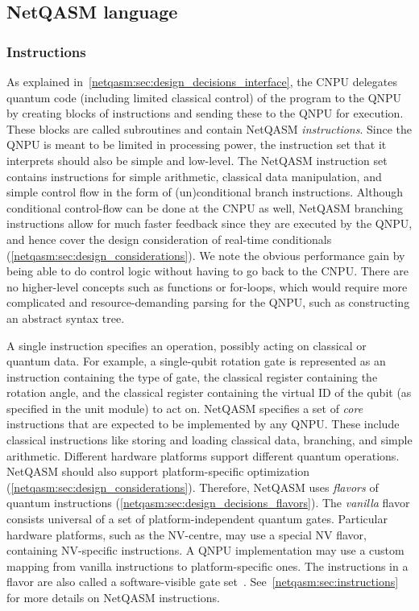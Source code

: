 \subsection{NetQASM language}

\subsubsection{Instructions}
\label{netqasm:sec:design_decisions_language}
As explained in~\cref{netqasm:sec:design_decisions_interface}, the \ac{CNPU} delegates quantum code (including limited classical control) of the program to the \ac{QNPU} by creating blocks of instructions and sending these to the \ac{QNPU} for execution.
These blocks are called subroutines and contain \ac{NetQASM} \textit{instructions}.
Since the \ac{QNPU} is meant to be limited in processing power, the instruction set that it interprets should also be simple and low-level.
The \ac{NetQASM} instruction set contains instructions for simple arithmetic, classical data manipulation, and simple control flow in the form of (un)conditional branch instructions.
Although conditional control-flow can be done at the \ac{CNPU} as well, \ac{NetQASM} branching instructions allow for much faster feedback since they are executed by the \ac{QNPU}, and hence cover the design consideration of real-time conditionals (\cref{netqasm:sec:design_considerations}).
We note the obvious performance gain by being able to do control logic without having to go back to the \ac{CNPU}.
There are no higher-level concepts such as functions or for-loops, which would require more complicated and resource-demanding parsing for the \ac{QNPU}, such as constructing an abstract syntax tree.

A single instruction specifies an operation, possibly acting on classical or quantum data.
For example, a single-qubit rotation gate is represented as an instruction containing the type of gate, the classical register containing the rotation angle, and the classical register containing the virtual ID of the qubit (as specified in the unit module) to act on.
\ac{NetQASM} specifies a set of \textit{core} instructions that are expected to be implemented by any \ac{QNPU}.
These include classical instructions like storing and loading classical data, branching, and simple arithmetic.
Different hardware platforms support different quantum operations.
\ac{NetQASM} should also support platform-specific optimization (\cref{netqasm:sec:design_considerations}).
Therefore, \ac{NetQASM} uses \textit{flavors} of quantum instructions (\cref{netqasm:sec:design_decisions_flavors}).
The \textit{vanilla} flavor consists universal of a set of platform-independent quantum gates.
Particular hardware platforms, such as the NV-centre, may use a special NV flavor, containing NV-specific instructions.
A \ac{QNPU} implementation may use a custom mapping from vanilla instructions to platform-specific ones.
The instructions in a flavor are also called a software-visible gate set~\cite{murali2019fullstack}.
See~\cref{netqasm:sec:instructions} for more details on \ac{NetQASM} instructions.

